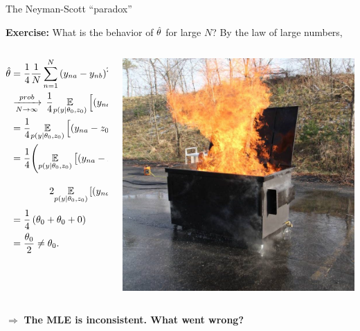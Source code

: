 \begin{frame}{The Neyman-Scott ``paradox''}

\textbf{Exercise:}
What is the behavior of $\hat\theta$ for large $N$?
By the law of large numbers,
%
\begin{columns}
%
\begin{column}{0.7\textwidth}
\begin{align*}
%
\thetahat &={} \frac{1}{4} \meann \left( y_{na}  - y_{nb}\right)^2\\
&\plim{} \frac{1}{4}
\expect{p(y | \theta_0, z_0)}{\left( y_{na}  - y_{nb}\right)^2}
\\&=
\frac{1}{4}
\expect{p(y | \theta_0, z_0)}{\left( y_{na} - z_{0n} - (y_{nb} - z_{0n})\right)^2}
\\&=
\frac{1}{4}\Bigg(
    \expect{p(y | \theta_0, z_0)}{( y_{na} - z_{0n})^2} +
    \expect{p(y | \theta_0, z_0)}{( y_{nb} - z_{0n})^2} +
    \\&\quad\quad\quad\quad
    2 \expect{p(y | \theta_0, z_0)}{( y_{na} - z_{0n})( y_{nb} - z_{0n})}
\Bigg)
\\&=
\frac{1}{4}\left(\theta_0 + \theta_0 + 0\right)
\\&= \frac{\theta_0}{2} \ne \theta_0.
%
\end{align*}
%
\end{column}
\begin{column}{0.3\textwidth}
    \includegraphics[width=1.0\textwidth]{static_images/dumpster.jpg}
\end{column}
\end{columns}

\vspace{2em}
$\Rightarrow$ \textbf{The MLE is inconsistent.  What went wrong?}

\end{frame}


